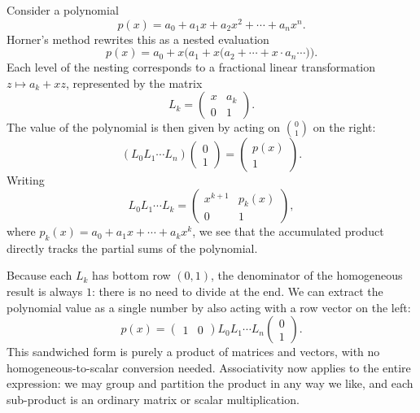 \documentclass{article}
\begin{document}
Consider a polynomial
\begin{equation}
  p(x) = a_0 + a_1 x + a_2 x^2 + \cdots + a_n x^n.
\end{equation}
Horner's method rewrites this as a nested evaluation
\begin{equation}
  p(x) = a_0 + x\bigl(a_1 + x\bigl(a_2 + \cdots + x \cdot a_n \cdots\bigr)\bigr).
\end{equation}
Each level of the nesting corresponds to a fractional linear transformation $z \mapsto a_k + xz$, represented by the matrix
\begin{equation}
  L_k = \begin{pmatrix} x & a_k \\ 0 & 1 \end{pmatrix}.
\end{equation}
The value of the polynomial is then given by acting on $\binom{0}{1}$ on the right:
\begin{equation}
  (L_0 L_1 \cdots L_n) \begin{pmatrix} 0 \\ 1 \end{pmatrix} = \begin{pmatrix} p(x) \\ 1 \end{pmatrix}.
\end{equation}
Writing
\begin{equation}
  L_0 L_1 \cdots L_k = \begin{pmatrix} x^{k+1} & p_k(x) \\ 0 & 1 \end{pmatrix},
\end{equation}
where $p_k(x) = a_0 + a_1 x + \cdots + a_k x^k$, we see that the accumulated product directly tracks the partial sums of the polynomial.

Because each $L_k$ has bottom row $(0, 1)$, the denominator of the homogeneous result is always $1$: there is no need to divide at the end. We can extract the polynomial value as a single number by also acting with a row vector on the left:
\begin{equation}
  p(x) = \begin{pmatrix} 1 & 0 \end{pmatrix} L_0 L_1 \cdots L_n \begin{pmatrix} 0 \\ 1 \end{pmatrix}.
\end{equation}
This sandwiched form is purely a product of matrices and vectors, with no homogeneous-to-scalar conversion needed. Associativity now applies to the entire expression: we may group and partition the product in any way we like, and each sub-product is an ordinary matrix or scalar multiplication.
\end{document}
